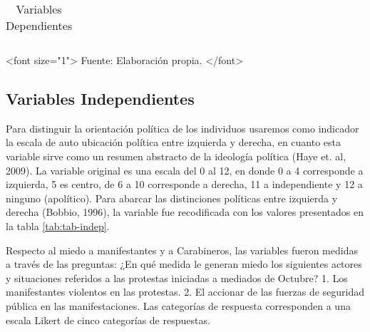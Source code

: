 \documentclass[12pt,twoside]{templates/facsothesis}
\begin{document}
\begin{table}

\caption{\label{tab:tab-dep}Variables Dependientes}
\centering
\begin{tabular}[t]{}
\hline

\hline
\end{tabular}
\end{table}

\begin{center}
<font size="1"> Fuente: Elaboración propia. </font>
\end{center}

\hypertarget{variables-independientes}{%
\subsection{Variables Independientes}\label{variables-independientes}}

Para distinguir la orientación política de los individuos usaremos como indicador la escala de auto ubicación política entre izquierda y derecha, en cuanto esta variable sirve como un resumen abstracto de la ideología política (Haye et. al, 2009). La variable original es una escala del 0 al 12, en donde 0 a 4 corresponde a izquierda, 5 es centro, de 6 a 10 corresponde a derecha, 11 a independiente y 12 a ninguno (apolítico). Para abarcar las distinciones políticas entre izquierda y derecha (Bobbio, 1996), la variable fue recodificada con los valores presentados en la tabla \ref{tab:tab-indep}.

Respecto al miedo a manifestantes y a Carabineros, las variables fueron medidas a través de las preguntas: ¿En qué medida le generan miedo los siguientes actores y situaciones referidos a las protestas iniciadas a mediados de Octubre? 1. Los manifestantes violentos en las protestas. 2. El accionar de las fuerzas de seguridad pública en las manifestaciones. Las categorías de respuesta corresponden a una escala Likert de cinco categorías de respuestas.
\end{document}
